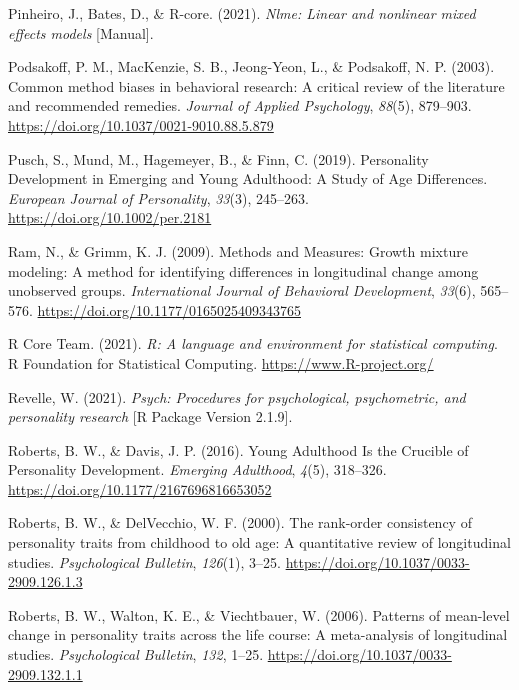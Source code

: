 \documentclass[
  english,
  man,floatsintext]{apa7}
\begin{document}
\leavevmode\hypertarget{ref-R-nlme}{}%
Pinheiro, J., Bates, D., \& R-core. (2021). \emph{Nlme: Linear and nonlinear mixed effects models} {[}Manual{]}.

\leavevmode\hypertarget{ref-podsakoffCommonMethodBiases2003}{}%
Podsakoff, P. M., MacKenzie, S. B., Jeong-Yeon, L., \& Podsakoff, N. P. (2003). Common method biases in behavioral research: A critical review of the literature and recommended remedies. \emph{Journal of Applied Psychology}, \emph{88}(5), 879--903. \url{https://doi.org/10.1037/0021-9010.88.5.879}

\leavevmode\hypertarget{ref-puschPersonalityDevelopmentEmerging2019}{}%
Pusch, S., Mund, M., Hagemeyer, B., \& Finn, C. (2019). Personality Development in Emerging and Young Adulthood: A Study of Age Differences. \emph{European Journal of Personality}, \emph{33}(3), 245--263. \url{https://doi.org/10.1002/per.2181}

\leavevmode\hypertarget{ref-ramMethodsMeasuresGrowth2009}{}%
Ram, N., \& Grimm, K. J. (2009). Methods and Measures: Growth mixture modeling: A method for identifying differences in longitudinal change among unobserved groups. \emph{International Journal of Behavioral Development}, \emph{33}(6), 565--576. \url{https://doi.org/10.1177/0165025409343765}

\leavevmode\hypertarget{ref-R-base}{}%
R Core Team. (2021). \emph{R: A language and environment for statistical computing}. R Foundation for Statistical Computing. \url{https://www.R-project.org/}

\leavevmode\hypertarget{ref-R-psych}{}%
Revelle, W. (2021). \emph{Psych: Procedures for psychological, psychometric, and personality research} {[}R Package Version 2.1.9{]}.

\leavevmode\hypertarget{ref-robertsYoungAdulthoodCrucible2016}{}%
Roberts, B. W., \& Davis, J. P. (2016). Young Adulthood Is the Crucible of Personality Development. \emph{Emerging Adulthood}, \emph{4}(5), 318--326. \url{https://doi.org/10.1177/2167696816653052}

\leavevmode\hypertarget{ref-robertsRankorderConsistencyPersonality2000}{}%
Roberts, B. W., \& DelVecchio, W. F. (2000). The rank-order consistency of personality traits from childhood to old age: A quantitative review of longitudinal studies. \emph{Psychological Bulletin}, \emph{126}(1), 3--25. \url{https://doi.org/10.1037/0033-2909.126.1.3}

\leavevmode\hypertarget{ref-robertsPatternsMeanlevelChange2006a}{}%
Roberts, B. W., Walton, K. E., \& Viechtbauer, W. (2006). Patterns of mean-level change in personality traits across the life course: A meta-analysis of longitudinal studies. \emph{Psychological Bulletin}, \emph{132}, 1--25. \url{https://doi.org/10.1037/0033-2909.132.1.1}
\end{document}

